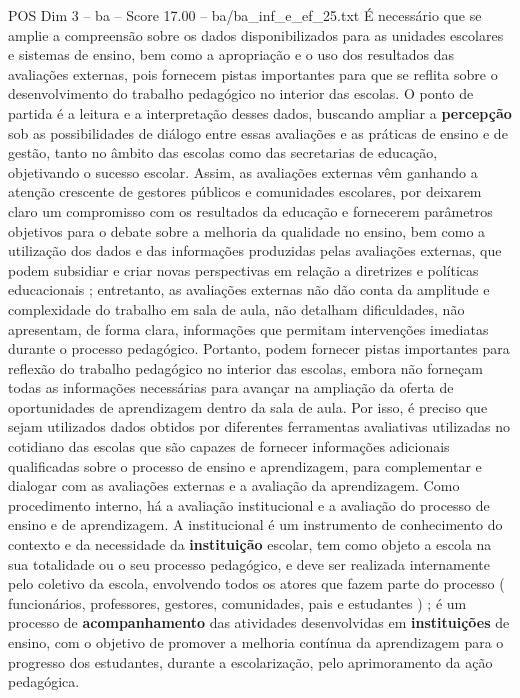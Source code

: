\begin{textsample}{POS Dim 3 – ba – Score 17.00 – ba/ba\_inf\_e\_ef\_25.txt}
É necessário que se amplie a compreensão sobre os dados disponibilizados para as unidades escolares e sistemas de ensino, bem como a apropriação e o uso dos resultados das avaliações externas, pois fornecem pistas importantes para que se reflita sobre o desenvolvimento do trabalho pedagógico no interior das escolas.
O ponto de partida é a leitura e a interpretação desses dados, buscando ampliar a \textbf{percepção} sob as possibilidades de diálogo entre essas avaliações e as práticas de ensino e de gestão, tanto no âmbito das escolas como das secretarias de educação, objetivando o sucesso escolar.
Assim, as avaliações externas vêm ganhando a atenção crescente de gestores públicos e comunidades escolares, por deixarem claro um compromisso com os resultados da educação e fornecerem parâmetros objetivos para o debate sobre a melhoria da qualidade no ensino, bem como a utilização dos dados e das informações produzidas pelas avaliações externas, que podem subsidiar e criar novas perspectivas em relação a diretrizes e políticas educacionais ; entretanto, as avaliações externas não dão conta da amplitude e complexidade do trabalho em sala de aula, não detalham dificuldades, não apresentam, de forma clara, informações que permitam intervenções imediatas durante o processo pedagógico.
Portanto, podem fornecer pistas importantes para reflexão do trabalho pedagógico no interior das escolas, embora não forneçam todas as informações necessárias para avançar na ampliação da oferta de oportunidades de aprendizagem dentro da sala de aula.
Por isso, é preciso que sejam utilizados dados obtidos por diferentes ferramentas avaliativas utilizadas no cotidiano das escolas que são capazes de fornecer informações adicionais qualificadas sobre o processo de ensino e aprendizagem, para complementar e dialogar com as avaliações externas e a avaliação da aprendizagem.
Como procedimento interno, há a avaliação institucional e a avaliação do processo de ensino e de aprendizagem.
A institucional é um instrumento de conhecimento do contexto e da necessidade da \textbf{instituição} escolar, tem como objeto a escola na sua totalidade ou o seu processo pedagógico, e deve ser realizada internamente pelo coletivo da escola, envolvendo todos os atores que fazem parte do processo ( funcionários, professores, gestores, comunidades, pais e estudantes ) ; é um processo de \textbf{acompanhamento} das atividades desenvolvidas em \textbf{instituições} de ensino, com o objetivo de promover a melhoria contínua da aprendizagem para o progresso dos estudantes, durante a escolarização, pelo aprimoramento da ação pedagógica.

\end{textsample}
